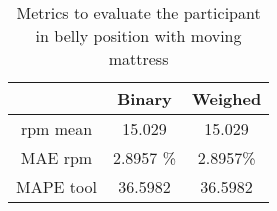 \begin{table}[H]
    \centering
    \begin{tabular}{|c|c|c|}
    \hline 
    & Binary & Weighed \\ 
    
    \hline 

    rpm mean   &  15.029 &  15.029 \\
    MAE rpm & 2.8957 \% &  2.8957\% \\
    MAPE tool  & 36.5982 & 36.5982 \\ 
    \hline 
    \end{tabular}
    
    \caption{Metrics to evaluate the participant in belly position with moving mattress}
    \label{tab:ProneNormalStillMetrics}
    \end{table}
    